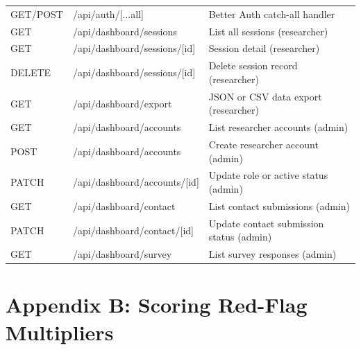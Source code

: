\documentclass[12pt,a4paper,oneside]{report}
\begin{document}
\begin{longtable}{llp{6cm}}
  GET/POST & /api/auth/[...all]                   & Better Auth catch-all handler \\
  GET      & /api/dashboard/sessions              & List all sessions (researcher) \\
  GET      & /api/dashboard/sessions/[id]         & Session detail (researcher) \\
  DELETE   & /api/dashboard/sessions/[id]         & Delete session record (researcher) \\
  GET      & /api/dashboard/export                & JSON or CSV data export (researcher) \\
  GET      & /api/dashboard/accounts              & List researcher accounts (admin) \\
  POST     & /api/dashboard/accounts              & Create researcher account (admin) \\
  PATCH    & /api/dashboard/accounts/[id]         & Update role or active status (admin) \\
  GET      & /api/dashboard/contact               & List contact submissions (admin) \\
  PATCH    & /api/dashboard/contact/[id]          & Update contact submission status (admin) \\
  GET      & /api/dashboard/survey                & List survey responses (admin) \\
  \bottomrule
\end{longtable}

\section*{Appendix B: Scoring Red-Flag Multipliers}
\end{document}
